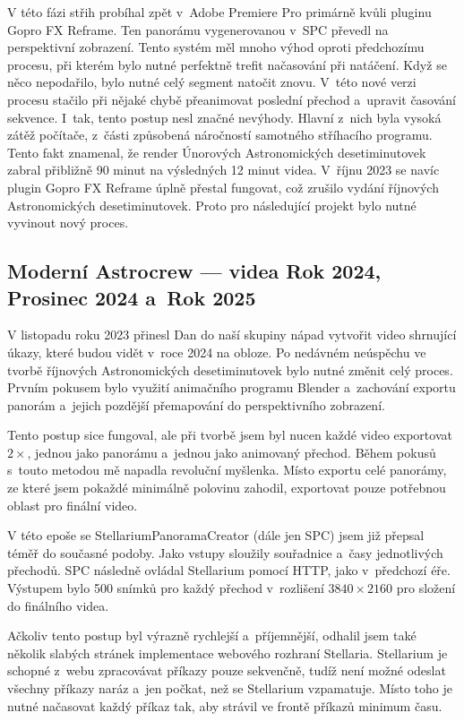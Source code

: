 \documentclass[12pt,a4paper,titlepage]{article}
\begin{document}
V této fázi střih probíhal zpět v~Adobe Premiere Pro primárně kvůli pluginu Gopro FX Reframe. Ten panorámu vygenerovanou v~SPC převedl na perspektivní zobrazení. Tento systém měl mnoho výhod oproti předchozímu procesu, při kterém bylo nutné perfektně trefit načasování při natáčení. Když se něco nepodařilo, bylo nutné celý segment natočit znovu. V~této nové verzi procesu stačilo při nějaké chybě přeanimovat poslední přechod a~upravit časování sekvence. I~tak, tento postup nesl značné nevýhody. Hlavní z~nich byla vysoká zátěž počítače, z~části způsobená náročností samotného stříhacího programu. Tento fakt znamenal, že render Únorových Astronomických desetiminutovek zabral přibližně 90 minut na výsledných 12 minut videa. V~říjnu 2023 se navíc plugin Gopro FX Reframe úplně přestal fungovat, což zrušilo vydání říjnových Astronomických desetiminutovek. Proto pro následující projekt bylo nutné vyvinout nový proces. 
\subsection{Moderní Astrocrew --- videa Rok 2024, Prosinec 2024 a~Rok 2025}
V listopadu roku 2023 přinesl Dan do naší skupiny nápad vytvořit video shrnující úkazy, které budou vidět v~roce 2024 na obloze. Po nedávném neúspěchu ve tvorbě říjnových Astronomických desetiminutovek bylo nutné změnit celý proces. Prvním pokusem bylo využití animačního programu Blender a~zachování exportu panorám a~jejich pozdější přemapování do perspektivního zobrazení. 

Tento postup sice fungoval, ale při tvorbě jsem byl nucen každé video exportovat \(2\times \), jednou jako panorámu a~jednou jako animovaný přechod. Během pokusů s~touto metodou mě napadla revoluční myšlenka. Místo exportu celé panorámy, ze které jsem pokaždé minimálně polovinu zahodil, exportovat pouze potřebnou oblast pro finální video. 

V této epoše se StellariumPanoramaCreator (dále jen SPC) jsem již přepsal téměř do současné podoby. Jako vstupy sloužily souřadnice a~časy jednotlivých přechodů. SPC následně ovládal Stellarium pomocí HTTP, jako v~předchozí éře. Výstupem bylo 500 snímků pro každý přechod v~rozlišení \(3840\times2160\) pro složení do finálního videa. 

Ačkoliv tento postup byl výrazně rychlejší a~příjemnější, odhalil jsem také několik slabých stránek implementace webového rozhraní Stellaria. Stellarium je schopné z~webu zpracovávat příkazy pouze sekvenčně, tudíž není možné odeslat všechny příkazy naráz a~jen počkat, než se Stellarium vzpamatuje. Místo toho je nutné načasovat každý příkaz tak, aby strávil ve frontě příkazů minimum času. 
\end{document}
